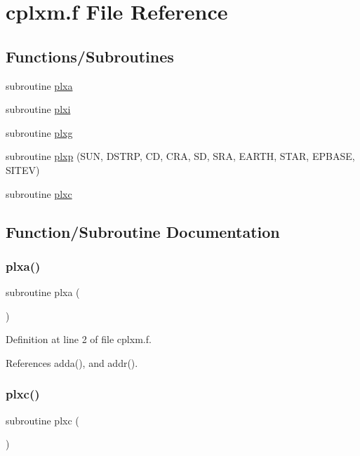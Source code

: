 \hypertarget{cplxm_8f}{}\section{cplxm.\+f File Reference}
\label{cplxm_8f}
\subsection*{Functions/\+Subroutines}
\begin{DoxyCompactItemize}
\item 
subroutine \hyperlink{cplxm_8f_a5e47db79e496a8dad8fdb08f2a20ba3f}{plxa}
\item 
subroutine \hyperlink{cplxm_8f_a06a83e4d1d82ffb6c73c07663a1bca15}{plxi}
\item 
subroutine \hyperlink{cplxm_8f_aeb9a6a91a6c6a76bf8bfb1913470f4bd}{plxg}
\item 
subroutine \hyperlink{cplxm_8f_a8b488c123c5ec8fb6bd87aa9e12a13e3}{plxp} (S\+UN, D\+S\+T\+RP, CD, C\+RA, SD, S\+RA, E\+A\+R\+TH, S\+T\+AR, E\+P\+B\+A\+SE, S\+I\+T\+EV)
\item 
subroutine \hyperlink{cplxm_8f_ad39eba7b0e0a87bccbb3236f99c9a534}{plxc}
\end{DoxyCompactItemize}


\subsection{Function/\+Subroutine Documentation}
\mbox{\label{cplxm_8f_a5e47db79e496a8dad8fdb08f2a20ba3f}} 
\subsubsection{\texorpdfstring{plxa()}{plxa()}}
{\footnotesize\ttfamily subroutine plxa (\begin{DoxyParamCaption}{ }\end{DoxyParamCaption})}



Definition at line 2 of file cplxm.\+f.



References adda(), and addr().

\mbox{\label{cplxm_8f_ad39eba7b0e0a87bccbb3236f99c9a534}} 
\subsubsection{\texorpdfstring{plxc()}{plxc()}}
{\footnotesize\ttfamily subroutine plxc (\begin{DoxyParamCaption}{ }\end{DoxyParamCaption})}




